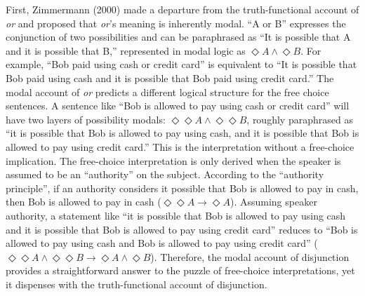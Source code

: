 \documentclass[oneside]{report}
\theoremstyle{definition}
\theoremstyle{definition}
\theoremstyle{definition}
\theoremstyle{remark}
\begin{document}
First, Zimmermann (2000) made a departure from the truth-functional
account of \emph{or} and proposed that \emph{or}'s meaning is inherently
modal. ``A or B'' expresses the conjunction of two possibilities and can
be paraphrased as ``It is possible that A and it is possible that B,''
represented in modal logic as \(\Diamond A \land \Diamond B\). For
example, ``Bob paid using cash or credit card'' is equivalent to ``It is
possible that Bob paid using cash and it is possible that Bob paid using
credit card.'' The modal account of \emph{or} predicts a different
logical structure for the free choice sentences. A sentence like ``Bob
is allowed to pay using cash or credit card'' will have two layers of
possibility modals: \(\Diamond\Diamond A \land \Diamond\Diamond B\),
roughly paraphrased as ``it is possible that Bob is allowed to pay using
cash, and it is possible that Bob is allowed to pay using credit card.''
This is the interpretation without a free-choice implication. The
free-choice interpretation is only derived when the speaker is assumed
to be an ``authority'' on the subject. According to the ``authority
principle'', if an authority considers it possible that Bob is allowed
to pay in cash, then Bob is allowed to pay in cash
(\(\Diamond \Diamond A \rightarrow \Diamond A\)). Assuming speaker
authority, a statement like ``it is possible that Bob is allowed to pay
using cash and it is possible that Bob is allowed to pay using credit
card'' reduces to ``Bob is allowed to pay using cash and Bob is allowed
to pay using credit card''
(\(\Diamond\Diamond A \land \Diamond\Diamond B \rightarrow \Diamond A \land \Diamond B\)).
Therefore, the modal account of disjunction provides a straightforward
answer to the puzzle of free-choice interpretations, yet it dispenses
with the truth-functional account of disjunction.
\end{document}
